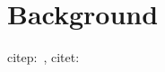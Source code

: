 \chapter{Background}\label{ch:background}

\lipsum[1]

citep:~\citep{knuth:1974}, citet:\citet{knuth:1974}
